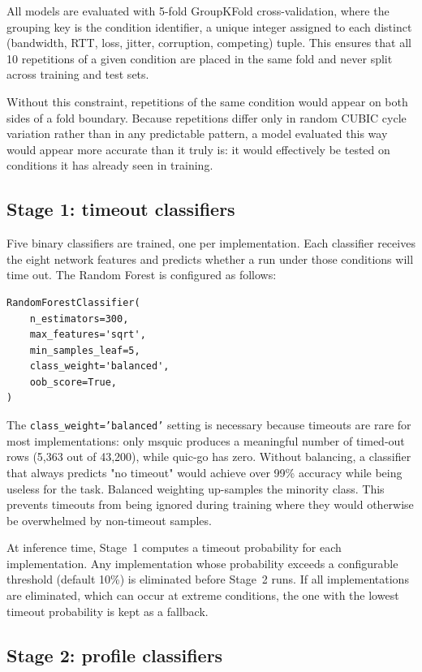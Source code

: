 All models are evaluated with 5-fold GroupKFold cross-validation, where the
grouping key is the condition identifier, a unique integer assigned to each
distinct (bandwidth, RTT, loss, jitter, corruption, competing) tuple. This
ensures that all 10 repetitions of a given condition are placed in the same
fold and never split across training and test sets.

Without this constraint, repetitions of the same condition would appear on
both sides of a fold boundary. Because repetitions differ only in random
CUBIC cycle variation rather than in any predictable pattern, a model evaluated
this way would appear more accurate than it truly is: it would effectively
be tested on conditions it has already seen in training.

\subsection{Stage 1: timeout classifiers}
\label{subsec:stage1}

Five binary classifiers are trained, one per implementation. Each classifier
receives the eight network features and predicts whether a run under those
conditions will time out. The Random Forest is configured as follows:

\begin{verbatim}
RandomForestClassifier(
    n_estimators=300,
    max_features='sqrt',
    min_samples_leaf=5,
    class_weight='balanced',
    oob_score=True,
)
\end{verbatim}

The \texttt{class\_weight='balanced'} setting is necessary because timeouts
are rare for most implementations: only msquic produces a meaningful number
of timed-out rows (5,363 out of 43,200), while quic-go has zero. Without
balancing, a classifier that always predicts "no timeout" would achieve
over 99\% accuracy while being useless for the task. Balanced weighting
up-samples the minority class. This prevents timeouts from being ignored
during training where they would otherwise be overwhelmed by non-timeout
samples.

At inference time, Stage~1 computes a timeout probability for each
implementation. Any implementation whose probability exceeds a configurable
threshold (default 10\%) is eliminated before Stage~2 runs. If all
implementations are eliminated, which can occur at extreme conditions,
the one with the lowest timeout probability is kept as a fallback.

\subsection{Stage 2: profile classifiers}
\label{subsec:stage2}

